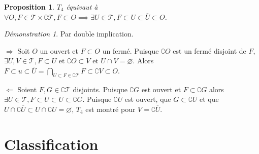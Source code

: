 \documentclass[a4paper, 11pt, french]{book}
\newenvironment{itemise}{\itemize}{\enditemize}
\theoremstyle{plain} %
\newtheorem{proposition}{Proposition}
\theoremstyle{definition} %
\theoremstyle{remark} %
\newtheorem*{demonstration}{Démonstration}
\newcommand{\1}{\mathds{1}}
\newcommand\vide{\varnothing}
\newcommand\et{\text{ et }}
\begin{document}
\begin{proposition}
	$T_4$ équivaut à $\forall O, F\in\mathscr{T}\times\complement\mathscr{T}, F\subset O\implies\exists U\in\mathscr{T}, F\subset U\subset\overline{U}\subset O$.
\end{proposition}

\begin{demonstration}
	Par double implication.
	\begin{itemise}
		\item[$\Rightarrow$] Soit $O$ un ouvert et $F\subset O$ un fermé.
		Puisque $\complement O$ est un fermé disjoint de $F$, $\exists U, V\in\mathscr{T}, F\subset U\et\complement O\subset V\et U\cap V=\vide$.
		Alors $F\subset u\subset\overline{U}=\bigcap_{U\subset F\in\complement\mathscr{T}}F\subset\complement V\subset O$.
		\item[$\Leftarrow$] Soient $F, G\in\complement\mathscr{T}$ disjoints.
		Puisque $\complement G$ est ouvert et $F\subset\complement G$ alors $\exists U\in\mathscr{T}, F\subset U\subset\overline{U}\subset\complement G$.
		Puisque $\complement\overline{U}$ est ouvert, que $G\subset\complement\overline{U}$ et que $U\cap\complement\overline{U}\subset U\cap\complement U=\vide$, $T_4$ est montré pour $V=\complement\overline{U}$.
	\end{itemise}
\end{demonstration}

\section{Classification}
\end{document}

